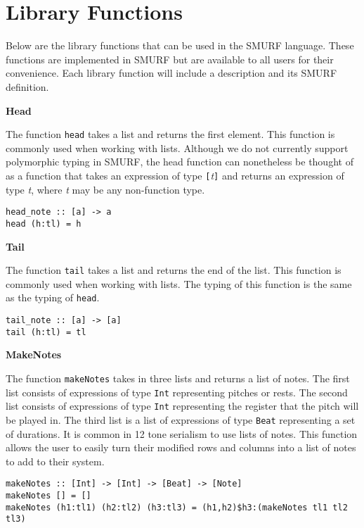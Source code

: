 \section{Library Functions}

Below are the library functions that can be used in the SMURF language. 
These functions are implemented in SMURF but are available to all users 
for their convenience. Each library function will include a description 
and its SMURF definition. \newline

\noindent\textbf{Head}

The function \texttt{head} takes a list and returns the first element. 
This function is commonly used when working with lists. Although we do not currently
support polymorphic typing in SMURF, the head function can nonetheless be thought
of as a function that takes an expression of type \texttt{[}\emph{t}\texttt{]} and returns an expression
of type \emph{t}, where \emph{t} may be any non-function type.

\begin{verbatim}
head_note :: [a] -> a
head (h:tl) = h
\end{verbatim} 


\noindent\textbf{Tail}

The function \texttt{tail} takes a list and returns the end of the list.
This function is commonly used when working with lists. The typing of this function is the same
as the typing of \texttt{head}.

\begin{verbatim}
tail_note :: [a] -> [a]
tail (h:tl) = tl
\end{verbatim} 


\noindent\textbf{MakeNotes}

The function \texttt{makeNotes} takes in three lists and returns a list 
of notes. The first list consists of expressions of type \texttt{Int} representing 
pitches or rests. The second list consists of expressions of type \texttt{Int}
representing the register that the pitch will be played in. The third list is a list 
of expressions of type \texttt{Beat} representing a set of durations. It is common in 
12 tone serialism to use lists of notes. This function allows the user 
to easily turn their modified rows and columns into a list of notes to add 
to their system. 

\begin{verbatim}
makeNotes :: [Int] -> [Int] -> [Beat] -> [Note]
makeNotes [] = []
makeNotes (h1:tl1) (h2:tl2) (h3:tl3) = (h1,h2)$h3:(makeNotes tl1 tl2 tl3)
\end{verbatim}
